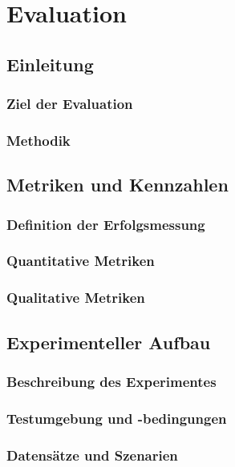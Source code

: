\documentclass[a4paper,10pt,twoside]{report}
\begin{document}

\chapter{Evaluation}

\section{Einleitung}
\subsection{Ziel der Evaluation}
\subsection{Methodik}

\section{Metriken und Kennzahlen}
\subsection{Definition der Erfolgsmessung}
\subsection{Quantitative Metriken}
\subsection{Qualitative Metriken}

\section{Experimenteller Aufbau}
\subsection{Beschreibung des Experimentes}
\subsection{Testumgebung und -bedingungen}
\subsection{Datensätze und Szenarien}
\end{document}
